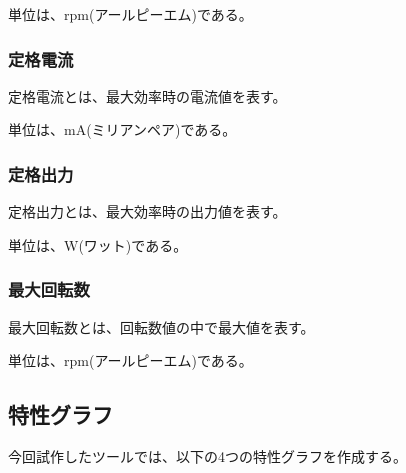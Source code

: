 単位は、rpm(アールピーエム)である。

\subsubsection{定格電流}\label{sub:sub:teikakuden}
定格電流とは、最大効率時の電流値を表す。

単位は、mA(ミリアンペア)である。
\subsubsection{定格出力}\label{sub:sub:teikakusyutu}
定格出力とは、最大効率時の出力値を表す。

単位は、W(ワット)である。
\subsubsection{最大回転数}\label{sub:sub:saidaikai}
最大回転数とは、回転数値の中で最大値を表す。

単位は、rpm(アールピーエム)である。
\subsection{特性グラフ}\label{sub:tokuseigurahu}
今回試作したツールでは、以下の4つの特性グラフを作成する。
